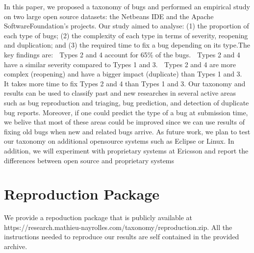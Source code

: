 \documentclass[10pt,journal,compsoc, twoside]{IEEEtran}
\begin{document}
In this paper, we proposed a taxonomy of bugs and performed an empirical study on two large open source datasets: the Netbeans IDE and the Apache SoftwareFoundation’s projects. Our study aimed to analyse: (1) the proportion of each type of bugs; (2) the complexity of each type in terms of severity, reopening and duplication; and (3) the required time to fix a bug depending on its type.The key findings are:  Types 2 and 4 account for 65\% of the bugs.  Types 2 and 4 have a similar severity compared to Types 1 and 3.  Types 2 and 4 are more complex (reopening) and have a bigger impact (duplicate) than Types 1 and 3.  It takes more time to fix Types 2 and 4 than Types 1 and 3. Our taxonomy and results can be used to classify past and new researches in several active areas such as bug reproduction and triaging, bug prediction, and detection of duplicate bug reports. Moreover, if one could predict the type of a bug at submission time, we belive that most of these areas could be improved since we can use results of fixing old bugs when new and related bugs arrive. As future work, we plan to test our taxonomy on additional opensource systems such as Eclipse or Linux. In addition, we will experiment with proprietary systems at Ericsson and report the differences between open source and proprietary systems

\section{Reproduction Package}

We provide a repoduction package that is publicly available at https://research.mathieu-nayrolles.com/taxonomy/reproduction.zip.
All the instructions needed to reproduce our results are self contained in the provided archive.


% 


\ifCLASSOPTIONcaptionsoff
  \newpage
\fi



\end{document}
